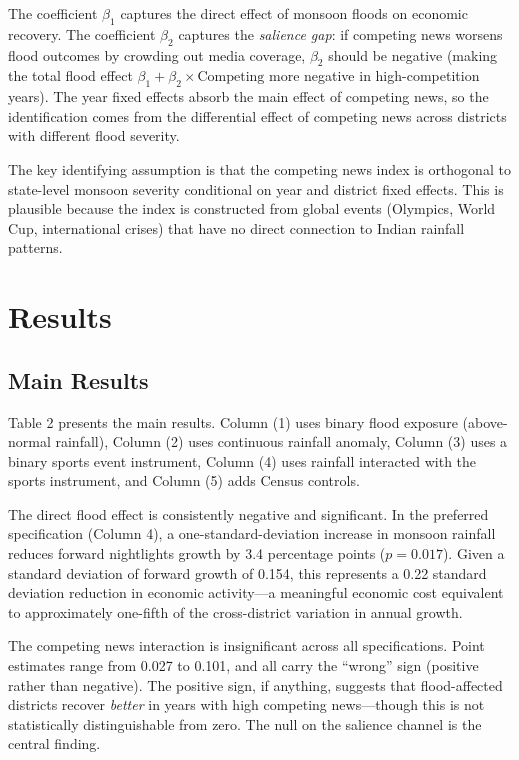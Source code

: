 \documentclass[12pt]{article}
\begin{document}
The coefficient $\beta_1$ captures the direct effect of monsoon floods on economic recovery. The coefficient $\beta_2$ captures the \textit{salience gap}: if competing news worsens flood outcomes by crowding out media coverage, $\beta_2$ should be negative (making the total flood effect $\beta_1 + \beta_2 \times \text{Competing}$ more negative in high-competition years). The year fixed effects absorb the main effect of competing news, so the identification comes from the differential effect of competing news across districts with different flood severity.

The key identifying assumption is that the competing news index is orthogonal to state-level monsoon severity conditional on year and district fixed effects. This is plausible because the index is constructed from global events (Olympics, World Cup, international crises) that have no direct connection to Indian rainfall patterns.


\section{Results}

\subsection{Main Results}

{\footnotesize}

Table 2 presents the main results. Column (1) uses binary flood exposure (above-normal rainfall), Column (2) uses continuous rainfall anomaly, Column (3) uses a binary sports event instrument, Column (4) uses rainfall interacted with the sports instrument, and Column (5) adds Census controls.

The direct flood effect is consistently negative and significant. In the preferred specification (Column 4), a one-standard-deviation increase in monsoon rainfall reduces forward nightlights growth by 3.4 percentage points ($p = 0.017$). Given a standard deviation of forward growth of 0.154, this represents a 0.22 standard deviation reduction in economic activity---a meaningful economic cost equivalent to approximately one-fifth of the cross-district variation in annual growth.

The competing news interaction is insignificant across all specifications. Point estimates range from 0.027 to 0.101, and all carry the ``wrong'' sign (positive rather than negative). The positive sign, if anything, suggests that flood-affected districts recover \textit{better} in years with high competing news---though this is not statistically distinguishable from zero. The null on the salience channel is the central finding.
\end{document}
